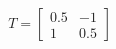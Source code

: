 \documentclass[preview]{standalone}
\begin{document}
\begin{align*}
T = \begin{bmatrix} 0.5 & -1 \\ 1 & 0.5 \end{bmatrix}
\end{align*}
\end{document}
